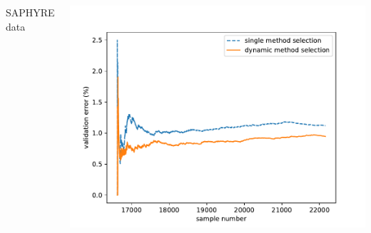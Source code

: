 \documentclass{beamer}
\begin{document}
\begin{frame}
\begin{columns}[c]
\begin{center}
SAPHYRE data
\end{center}
\includegraphics[width=\textwidth]{switching/saphyre/0.25/saphyre25}
\end{columns}

\end{frame}
\end{document}

